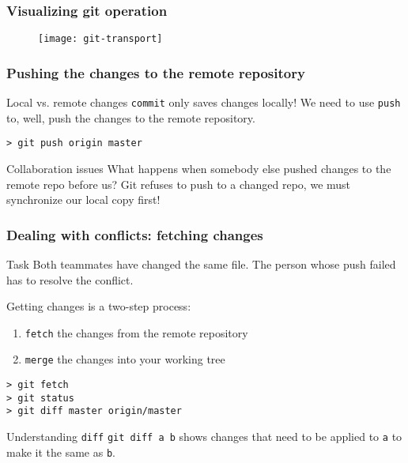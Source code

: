 \begin{frame}[fragile]
	\frametitle{Visualizing git operation}
	
	\begin{figure}
		\texttt{[image: git-transport]}
	\end{figure}
\end{frame}


\begin{frame}[fragile]
	\frametitle{Pushing the changes to the remote repository}
	
	\begin{block}{Local vs. remote changes}
	\texttt{commit} only saves changes \alert{locally}! We need to use \texttt{push} to, well, push the changes to the remote repository. 
	
	\begin{verbatim}
> git push origin master
	\end{verbatim}
	\end{block}

	\begin{block}{Collaboration issues}
What happens when somebody else pushed changes to the remote repo before us? Git refuses to push to a changed repo, we must synchronize our local copy first!
	\end{block}	
	
\end{frame}



\begin{frame}[fragile]
	\frametitle{Dealing with conflicts: fetching changes}

	\begin{block}{Task}
	Both teammates have changed the same file. The person whose push failed has to resolve the conflict.	
	\end{block}
	
	Getting changes is a two-step process:
	\begin{enumerate}
		\item \texttt{fetch} the changes from the remote repository
		\item \texttt{merge} the changes into your working tree
	\end{enumerate}
	
	\begin{verbatim}
> git fetch
> git status
> git diff master origin/master
	\end{verbatim}
	
	\begin{block}{Understanding \texttt{diff}}
	\texttt{git diff a b} shows changes that need to be applied to \texttt{a} to make it the same as \texttt{b}.
	\end{block}
	
\end{frame}

